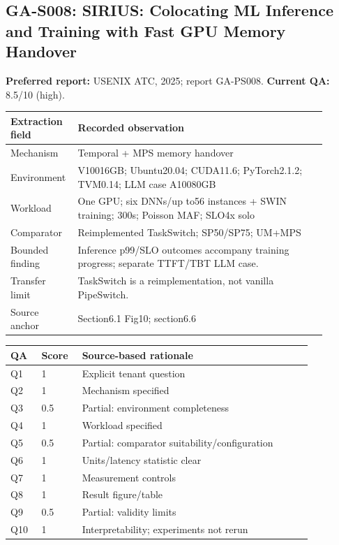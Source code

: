\subsection{GA-S008: SIRIUS: Colocating ML Inference and Training with Fast GPU Memory Handover}
\textbf{Preferred report:} USENIX ATC, 2025; report GA-PS008. \textbf{Current QA:} 8.5/10 (high).
\begin{longtable}{P{0.15\linewidth}P{0.75\linewidth}}
\toprule Extraction field & Recorded observation\\\midrule\endhead
Mechanism & Temporal + MPS memory handover\\
Environment & V10016GB; Ubuntu20.04; CUDA11.6; PyTorch2.1.2; TVM0.14; LLM case A10080GB\\
Workload & One GPU; six DNNs/up to56 instances + SWIN training; 300s; Poisson MAF; SLO4x solo\\
Comparator & Reimplemented TaskSwitch; SP50/SP75; UM+MPS\\
Bounded finding & Inference p99/SLO outcomes accompany training progress; separate TTFT/TBT LLM case.\\
Transfer limit & TaskSwitch is a reimplementation, not vanilla PipeSwitch.\\
Source anchor & Section6.1 Fig10; section6.6\\
\bottomrule\end{longtable}
\begin{longtable}{P{0.09\linewidth}P{0.10\linewidth}P{0.67\linewidth}}
\toprule QA & Score & Source-based rationale\\\midrule\endhead
Q1 & 1 & Explicit tenant question\\
Q2 & 1 & Mechanism specified\\
Q3 & 0.5 & Partial: environment completeness\\
Q4 & 1 & Workload specified\\
Q5 & 0.5 & Partial: comparator suitability/configuration\\
Q6 & 1 & Units/latency statistic clear\\
Q7 & 1 & Measurement controls\\
Q8 & 1 & Result figure/table\\
Q9 & 0.5 & Partial: validity limits\\
Q10 & 1 & Interpretability; experiments not rerun\\
\bottomrule\end{longtable}

